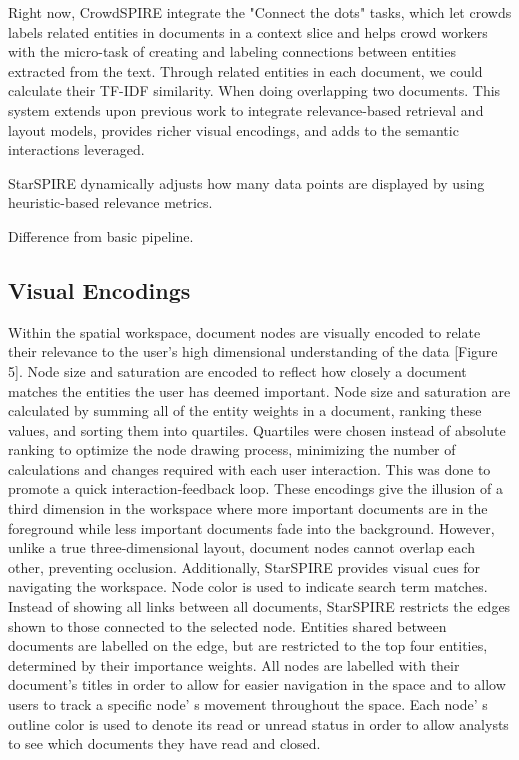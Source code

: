 \documentclass[journal]{vgtc}                %
\begin{document}
Right now, CrowdSPIRE integrate the "Connect the dots" tasks, which let crowds labels related entities in documents in a context slice and helps crowd workers with the micro-task of creating and labeling connections between entities extracted from the text.
Through related entities in each document, we could calculate their TF-IDF similarity. When doing overlapping two documents.
This system extends upon previous work to integrate relevance-based retrieval and layout models, provides richer visual encodings, and adds to the semantic interactions leveraged.

StarSPIRE dynamically adjusts how many data points are displayed by using heuristic-based relevance metrics.

Difference from basic pipeline.

\subsection{Visual Encodings}
Within the spatial workspace, document nodes are visually encoded to relate their relevance to the user’s high dimensional understanding of the data [Figure 5].
Node size and saturation are encoded to reflect how closely a document matches the entities the user has deemed important.
Node size and saturation are calculated by summing all of the entity weights in a document, ranking these values, and sorting them into quartiles.
Quartiles were chosen instead of absolute
ranking to optimize the node drawing process, minimizing the number of calculations and changes required with each user interaction.
This was done to promote a quick interaction-feedback loop.
These encodings give the illusion of a third dimension in the workspace where more important documents are in the foreground while less important documents fade into the background.
However, unlike a true three-dimensional layout, document nodes cannot overlap each other, preventing occlusion.
Additionally, StarSPIRE provides visual cues for navigating the workspace.
Node color is used to indicate search term matches.
Instead of showing all links between all documents, StarSPIRE restricts the edges shown to those connected to the selected node.
Entities shared between documents are labelled on the edge, but are restricted to the top four entities, determined by their importance weights.
All nodes are labelled with their document’s titles in order to allow for easier navigation in the space and to allow users to track a specific node’ s movement throughout the space.
Each node’ s outline color is used to denote its read or unread status in order to allow analysts to see which documents they have read and closed.
\end{document}
